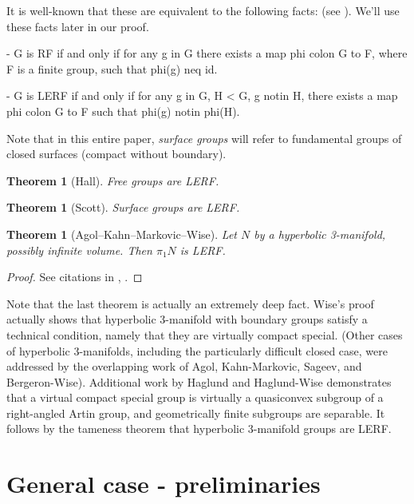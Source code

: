 \documentclass[12pt]{amsart}
\newtheorem{thm}[theorem]{Theorem}
\theoremstyle{definition}
\theoremstyle{remark}
\begin{document}
It is well-known that these are equivalent to the following facts: (see
\cite{LR}). We'll use these facts later in our proof.

- G is RF if and only if for any g in G there exists a map phi colon G to F,
where F is a finite group, such that phi(g) neq id.

- G is LERF if and only if for any g in G, H < G, g notin H, there exists a map
phi colon G to F such that phi(g) notin phi(H).

Note that in this entire paper, \emph{surface groups} will refer to fundamental
groups of closed surfaces (compact without boundary).

\begin{thm}[Hall] Free groups are LERF. \end{thm}

\begin{thm}[Scott] Surface groups are LERF. \end{thm}

\begin{thm}[Agol--Kahn--Markovic--Wise] Let $N$ by a hyperbolic 3-manifold,
possibly infinite volume.  Then $\pi_1N$ is LERF. \end{thm}

\begin{proof}

See citations in \cite{LR}, \cite{AFW}.

\end{proof}

Note that the last theorem is actually an extremely deep fact. Wise's proof
actually shows that hyperbolic 3-manifold with boundary groups satisfy
a technical condition, namely that they are virtually compact special. (Other
cases of hyperbolic 3-manifolds, including the particularly difficult closed
case, were addressed by the overlapping work of Agol, Kahn-Markovic, Sageev,
and Bergeron-Wise).  Additional work by Haglund and Haglund-Wise demonstrates
that a virtual compact special group is virtually a quasiconvex subgroup of
a right-angled Artin group, and geometrically finite subgroups are separable.
It follows by the tameness theorem that hyperbolic 3-manifold groups are LERF.


\section{General case - preliminaries}
\end{document}
